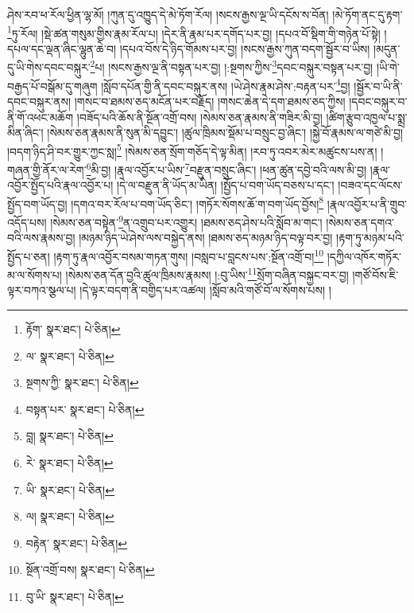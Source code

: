 ཤེས་རབ་ཕ་རོལ་ཕྱིན་ལྷ་མོ། །ཀུན་དུ་འཁྱུད་དེ་མེ་ཏོག་རོལ། །སངས་རྒྱས་ལྔ་ཡི་དངོས་ས་བོན། །མེ་ཏོག་ནང་དུ་རྟག་\footnote{རྟོག་  སྣར་ཐང་།  པེ་ཅིན། }ཏུ་རོལ། །སྡེ་ཚན་གསུམ་གྱིས་རྣམ་རོལ་པ། །དེར་ནི་རྣམ་པར་དགོད་པར་བྱ། །དཔའ་བོ་སྡིག་གི་གཉེན་པོ་སྟེ། །དཔལ་དང་ལྡན་ཞིང་ལྷུན་ཆེ་བ། །དཔའ་བོས་དེ་ཉིད་གོམས་པར་བྱ། །སངས་རྒྱས་ཀུན་བདག་སྦྱོར་བ་ཡིས། །མདུན་དུ་ཡི་གེས་དབང་བསྐུར་\footnote{ལ་  སྣར་ཐང་།  པེ་ཅིན། }པ། །སངས་རྒྱས་ལྔ་ནི་བསྟན་པར་བྱ། །:སྔགས་ཀྱིས་\footnote{སྔགས་ཀྱི་  སྣར་ཐང་།  པེ་ཅིན། }དབང་བསྐུར་བསྟན་པར་བྱ། །ཡི་གེ་བརྒྱད་པོ་བསྒོམ་དུ་གཞུག །སློབ་དཔོན་གྱི་ནི་དབང་བསྐུར་ནས། །ཡེ་ཤེས་རྣམ་ཤེས་:བརྟན་པར་\footnote{བསྟན་པར་  སྣར་ཐང་།  པེ་ཅིན། }བྱ། །སྦྱོར་བ་ཡི་ནི་དབང་བསྐུར་ནས། །གསང་བ་ཐམས་ཅད་མངོན་པར་བརྗོད། །གསང་ཆེན་དེ་དག་ཐམས་ཅད་ཀྱིས། །དབང་བསྐུར་བ་ནི་གོ་འཕང་མཆོག །བཟོད་པའི་ཆོས་ནི་སྔོན་འགྲོ་བས། །སེམས་ཅན་རྣམས་ནི་གཟིར་མི་བྱ། །ཚིག་རྩུབ་འཁྱལ་པ་སྨྲ་མིན་ཞིང་། །སེམས་ཅན་རྣམས་ནི་སུན་མི་དབྱུང་། །ཚུལ་ཁྲིམས་སྡོམ་པ་བསྲུང་བྱ་ཞིང་། །སྐྱེ་བོ་རྣམས་ལ་གཙེ་མི་བྱ། །བདག་ཉིད་ཤི་བར་གྱུར་ཀྱང་སླ།\footnote{བླ།  སྣར་ཐང་།  པེ་ཅིན། } །སེམས་ཅན་སྲོག་གཅོད་དེ་ལྟ་མིན། །རབ་ཏུ་འབར་མེར་མཚུངས་པས་ན། །གཞན་གྱི་ནོར་ལ་རེག་\footnote{རེ་  སྣར་ཐང་།  པེ་ཅིན། }མི་བྱ། །རྣལ་འབྱོར་པ་ཡིས་\footnote{ཡི་  སྣར་ཐང་།  པེ་ཅིན། }བརྫུན་བསྲུང་ཞིང་། །ཕན་ཚུན་དབྱེ་བའི་ལས་མི་བྱ། །རྣལ་འབྱོར་སྤྱོད་པའི་རྣལ་འབྱོར་པ། །དེ་ལ་བརྫུན་ནི་ཡོད་མ་ཡིན། །སྤྱོད་པ་བག་ཡོད་བཅས་པ་དང་། །བཟའ་དང་ལོངས་སྤྱོད་བག་ཡོད་བྱ། །དགའ་བར་རོལ་པ་བག་ཡོད་ཅིང་། །གཏོར་སོགས་ཆོ་ག་བག་ཡོད་བྱོས།\footnote{ལ།  སྣར་ཐང་།  པེ་ཅིན། } །རྣལ་འབྱོར་པ་ནི་གྲུབ་འདོད་པས། །སེམས་ཅན་བསྟེན་\footnote{བརྟེན་  སྣར་ཐང་།  པེ་ཅིན། }ན་འགྲུབ་པར་འགྱུར། །ཐམས་ཅད་ཤེས་པའི་སློབ་མ་གང་། །སེམས་ཅན་དགའ་བའི་ལས་རྣམས་བྱ། །མཉམ་ཉིད་ཡེ་ཤེས་ལས་བསྐྱེད་ནས། །ཐམས་ཅད་མཉམ་ཉིད་བལྟ་བར་བྱ། །རྟག་ཏུ་མཉམ་པའི་སྤྱོད་པ་ཅན། །རྟག་ཏུ་རྣལ་འབྱོར་བསམ་གཏན་གུས། །བསླབ་པ་བླངས་པས་:སྔོན་འགྲོ་བ།\footnote{སྔོན་འགྲོ་བས།  སྣར་ཐང་།  པེ་ཅིན། } །དཀྱིལ་འཁོར་གཏོར་མ་ལ་སོགས་པ། །སེམས་ཅན་དོན་བྱའི་ཚུལ་ཁྲིམས་རྣམས། །:བུ་ཡིས་\footnote{བུ་ཡི་  སྣར་ཐང་།  པེ་ཅིན། }སྲོག་བཞིན་བསྐྱང་བར་བྱ། །གཙོ་བོས་ཇི་ལྟར་བཀའ་སྩལ་པ། །དེ་ལྟར་བདག་ནི་བགྱིད་པར་འཚལ། །སློབ་མའི་གཙོ་བོ་ལ་སོགས་པས། །
